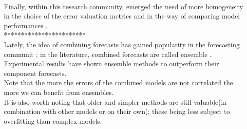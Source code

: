 \\
Finally, within this research community, emerged the need of more homogeneity in the choice of the error valuation metrics and in the way of comparing model performances \cite{EPF_review}.
\\
************************
\\
Lately, the idea of combining forecasts has gained popularity in the forecasting communit \cite{forecasting_big}; in the literature, combined forecasts are called ensemble \cite{gneiting_weather_ensemble}.
Experimental results have shown ensemble methods to outperform their component forecasts.
\\
Note that the more the errors of the combined models are not correlated the more we can benefit from ensembles.
\\
It is also worth noting that older and simpler methods are still valuable(in combination with other models or on their own); these being less subject to overfitting than complex models.
